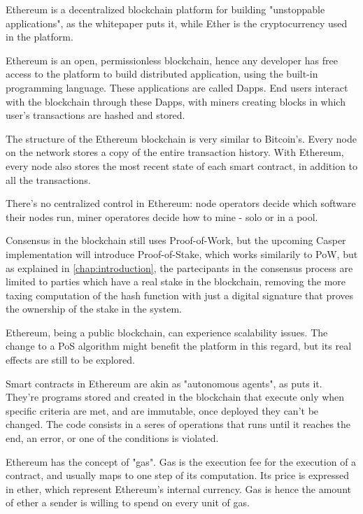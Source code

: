 Ethereum is a decentralized blockchain platform for building "unstoppable applications", as the whitepaper puts it, while Ether is the cryptocurrency used in the platform.

Ethereum is an open, permissionless blockchain, hence any developer has free access to the platform to build distributed application, using the built-in programming language. These applications are called Dapps. End users interact with the blockchain through these Dapps, with miners creating blocks in which user's transactions are hashed and stored. 

The structure of the Ethereum blockchain is very similar to Bitcoin's. Every node on the network stores a copy of the entire transaction history. With Ethereum, every node also stores the most recent state of each smart contract, in addition to all the transactions. 

There's no centralized control in Ethereum: node operators decide which software their nodes run, miner operatores decide how to mine - solo or in a pool. 

Consensus in the blockchain still uses Proof-of-Work, but the upcoming Casper implementation will introduce Proof-of-Stake, which works similarily to PoW, but as explained in \ref{chap:introduction}, the partecipants in the consensus process are limited to parties which have a real stake in the blockchain, removing the more taxing computation of the hash function with just a digital signature that proves the ownership of the stake in the system.

Ethereum, being a public blockchain, can experience scalability issues. The change to a PoS algorithm might benefit the platform in this regard, but its real effects are still to be explored.

Smart contracts in Ethereum are akin as "autonomous agents", as \cite{ethereumwhitepaper} puts it. They're programs stored and created in the blockchain that execute only when specific criteria are met, and are immutable, once deployed they can't be changed. The code consists in a seres of operations that runs until it reaches the end, an error, or one of the conditions is violated.

Ethereum has the concept of "gas". Gas is the execution fee for the execution of a contract, and usually maps to one step of its computation. Its price is expressed in ether, which represent Ethereum's internal currency. Gas is hence the amount of ether a sender is willing to spend on every unit of gas.

